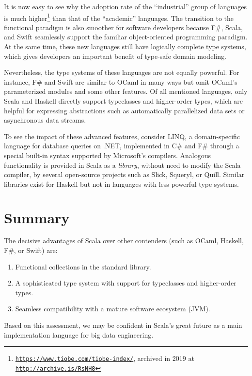 It is now easy to see why the adoption rate of the \textsf{``}industrial\textsf{''}
group of languages is much higher\footnote{\texttt{\href{https://www.tiobe.com/tiobe-index/}{https://www.tiobe.com/tiobe-index/}},
archived in 2019 at \texttt{\href{http://archive.is/RsNH8}{http://archive.is/RsNH8}}} than that of the \textsf{``}academic\textsf{''} languages. The transition to the
functional paradigm is also smoother for software developers because
F\#, Scala, and Swift seamlessly support the familiar object-oriented
programming paradigm. At the same time, these new languages still
have logically complete type systems, which gives developers an important
benefit of type-safe domain modeling.

Nevertheless, the type systems of these languages are not equally
powerful. For instance, F\# and Swift are similar to OCaml in many
ways but omit OCaml\textsf{'}s parameterized modules and some other features.
Of all mentioned languages, only Scala and Haskell directly support
typeclasses and higher-order types, which are helpful for expressing
abstractions such as automatically parallelized data sets or asynchronous
data streams.

To see the impact of these advanced features, consider LINQ, a domain-specific
language for database queries on .NET, implemented in C\# and F\#
through a special built-in syntax supported by Microsoft\textsf{'}s compilers.
Analogous functionality is provided in Scala as a \emph{library},
without need to modify the Scala compiler, by several open-source
projects such as Slick, Squeryl, or Quill. Similar libraries exist
for Haskell \textemdash{} but not in languages with less powerful
type systems.

\section{Summary}

The decisive advantages of Scala over other contenders (such as OCaml,
Haskell, F\#, or Swift) are:
\begin{enumerate}
\item Functional collections in the standard library.
\item A sophisticated type system with support for typeclasses and higher-order
types.
\item Seamless compatibility with a mature software ecosystem (JVM).
\end{enumerate}
Based on this assessment, we may be confident in Scala\textsf{'}s great future
as a main implementation language for big data engineering. 
